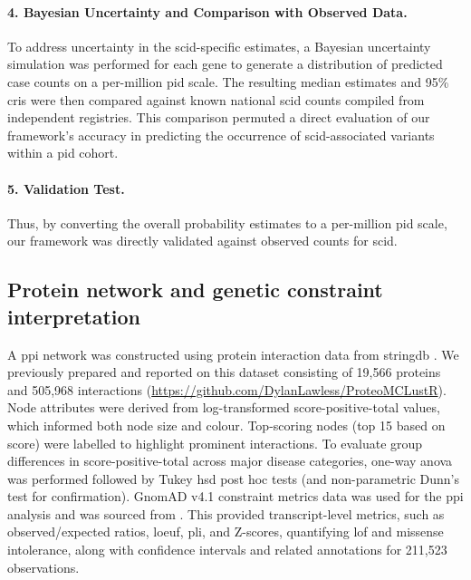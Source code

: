 \paragraph{4. Bayesian Uncertainty and Comparison with Observed Data.}
To address uncertainty in the \ac{scid}-specific estimates, a Bayesian uncertainty simulation was performed for each gene to generate a distribution of predicted case counts on a per-million \ac{pid} scale. 
The resulting median estimates and 95\% \ac{cri}s were then compared against known national \ac{scid} counts compiled from independent registries. 
This comparison permuted a direct evaluation of our framework’s accuracy in predicting the occurrence of \ac{scid}-associated variants within a \ac{pid} cohort.

\paragraph{5. Validation Test.}
Thus, by converting the overall probability estimates to a per-million \ac{pid} scale, our framework was directly validated against observed counts for \ac{scid}. %

\subsection{Protein network and genetic constraint interpretation}
A \ac{ppi} network was constructed using protein interaction data from \ac{stringdb} \cite{szklarczyk2025string}. We previously prepared and reported 
on this dataset consisting of 19,566 proteins and 505,968 interactions 
(\url{https://github.com/DylanLawless/ProteoMCLustR}).
Node attributes were derived from log-transformed score-positive-total values, which informed both node size and colour. Top-scoring nodes (top 15 based on score) were labelled to highlight prominent interactions. To evaluate group differences in score-positive-total across major disease categories, one-way \ac{anova} was performed followed by Tukey \ac{hsd} post hoc tests (and non-parametric Dunn’s test for confirmation). 
GnomAD v4.1 constraint metrics data was used for the \ac{ppi} analysis and was sourced from \citet{karczewski2020mutational}.
This provided transcript-level metrics, such as observed/expected ratios, \ac{loeuf}, \ac{pli}, and Z-scores, quantifying \ac{lof} and missense intolerance, along with confidence intervals and related annotations for 211,523 observations.

